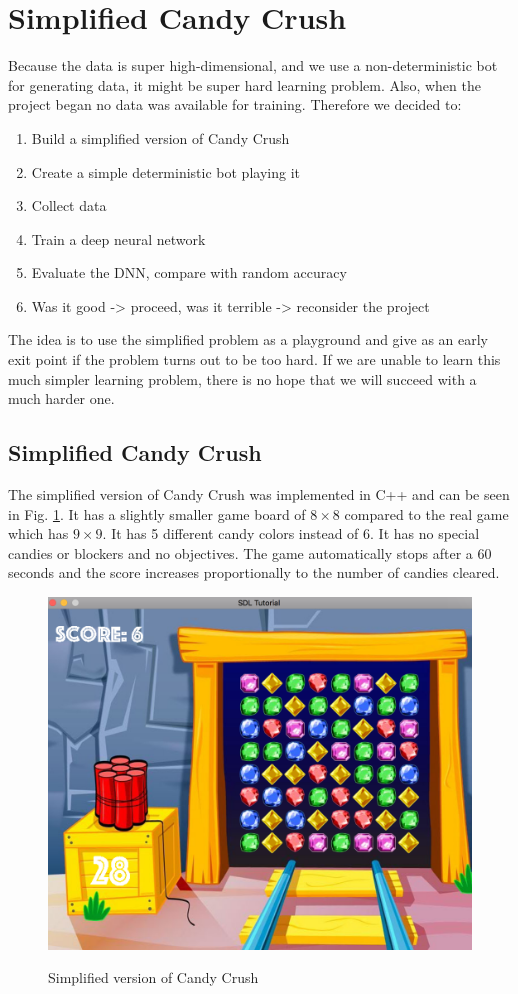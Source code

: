 \documentclass{kththesis}
\begin{document}
\section{Simplified Candy Crush}
Because the data is super high-dimensional, and we use a non-deterministic bot for generating data, it might be super hard learning problem.  Also, when the project began no data was available for training. Therefore we decided to:
\begin{enumerate}
\item Build a simplified version of Candy Crush
\item Create a simple deterministic bot playing it
\item Collect data
\item Train a deep neural network 
\item Evaluate the DNN, compare with random accuracy
\item Was it good -> proceed, was it terrible -> reconsider the project
\end{enumerate}
The idea is to use the simplified problem as a playground and give as an early exit point if the problem turns out to be too hard. If we are unable to learn this much simpler learning problem, there is no hope that we will succeed with a much harder one.

\subsection{Simplified Candy Crush}
The simplified version of Candy Crush was implemented in C++ and can be seen in Fig. \ref{fig:candy_small}. It has a slightly smaller game board of $8\times8$ compared to the real game which has $9\times9$. It has 5 different candy colors instead of 6. It has no special candies or blockers and no objectives. The game automatically stops after a 60 seconds and the score increases  proportionally to the number of candies cleared.
\begin{figure}
\centering
\includegraphics[width=\textwidth]{images/candy_small.png}
\label{fig:candy_small}
\caption{Simplified version of Candy Crush}
\end{figure}
\end{document}
